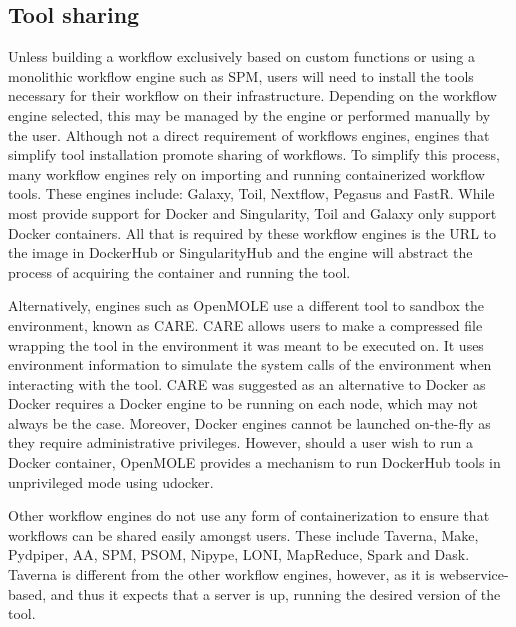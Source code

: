        \subsection{Tool sharing}\label{sharing}

            Unless building a workflow exclusively based on custom functions or
            using a monolithic workflow engine such as SPM, users will need to
            install the tools necessary for their workflow on their
            infrastructure. Depending on the workflow engine selected, this may
            be managed by the engine or performed manually by the user. Although
            not a direct requirement of workflows engines, engines that simplify
            tool installation promote sharing of workflows. To simplify this
            process, many workflow engines rely on importing and running
            containerized workflow tools. These engines include: Galaxy, Toil,
            Nextflow, Pegasus and FastR. While most provide support for Docker
            and Singularity, Toil and Galaxy only support Docker containers. All
            that is required by these workflow engines is the URL to the image
            in DockerHub or SingularityHub and the engine will abstract the
            process of acquiring the container and running the tool.

            Alternatively, engines such as OpenMOLE use a different tool to
            sandbox the environment, known as CARE. CARE allows users to make a
            compressed file wrapping the tool in the environment it was meant to
            be executed on. It uses environment information to simulate the
            system calls of the environment when interacting with the tool. CARE
            was suggested as an alternative to Docker as Docker requires a
            Docker engine to be running on each node, which may not always be
            the case. Moreover, Docker engines cannot be launched on-the-fly as
            they require administrative privileges. However, should a user wish
            to run a Docker container, OpenMOLE provides a mechanism to run
            DockerHub tools in unprivileged mode using udocker.

            Other workflow engines do not use any form of containerization to
            ensure that workflows can be shared easily amongst users. These
            include Taverna, Make, Pydpiper, AA, SPM, PSOM, Nipype, LONI,
            MapReduce, Spark and Dask. Taverna is different from the other
            workflow engines, however, as it is webservice-based, and thus it
            expects that a server is up, running the desired version of the
            tool.

